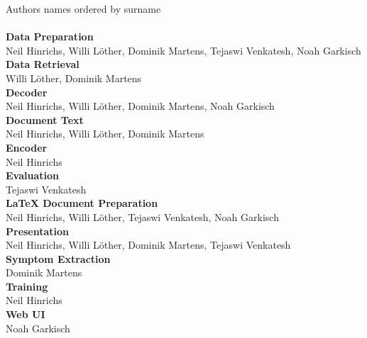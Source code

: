 
Authors names ordered by surname\\
\\
\textbf{Data Preparation}\\
Neil Hinrichs, Willi Löther, Dominik Martens, Tejaswi Venkatesh, Noah Garkisch
\\
\textbf{Data Retrieval}\\
Willi Löther, Dominik Martens
\\
\textbf{Decoder}\\
Neil Hinrichs, Willi Löther, Dominik Martens, Noah Garkisch
\\
\textbf{Document Text}\\
Neil Hinrichs, Willi Löther, Dominik Martens
\\
\textbf{Encoder}\\
Neil Hinrichs
\\
\textbf{Evaluation}\\
Tejaswi Venkatesh
\\
\textbf{LaTeX Document Preparation}\\
Neil Hinrichs, Willi Löther, Tejaswi Venkatesh, Noah Garkisch
\\
\textbf{Presentation}\\
Neil Hinrichs, Willi Löther, Dominik Martens, Tejaswi Venkatesh
\\
\textbf{Symptom Extraction}\\
Dominik Martens
\\
\textbf{Training}\\
Neil Hinrichs
\\
\textbf{Web UI}\\
Noah Garkisch
\\
